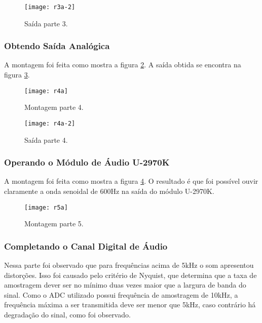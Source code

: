         \begin{figure}[H]
            \centering
            \caption{Saída parte 3.}
            \texttt{[image: r3a-2]}
            
            \label{fig:r3a-2}
        \end{figure}

    \subsubsection{Obtendo Saída Analógica}
    A montagem foi feita como mostra a figura \ref{fig:r4a}. A saída obtida se encontra na figura \ref{fig:r4a-2}.
    
         \begin{figure}[H]
             \centering
             \caption{Montagem parte 4.}
             \texttt{[image: r4a]}
             
             \label{fig:r4a}
            \end{figure}
            
            \begin{figure}[H]
                \centering
                \caption{Saída parte 4.}
                \texttt{[image: r4a-2]}
                
                \label{fig:r4a-2}
            \end{figure}
            
   \subsubsection{Operando o Módulo de Áudio U-2970K}
    A montagem foi feita como mostra a figura \ref{fig:r5a}. O resultado é que foi possível ouvir claramente a onda senoidal de 600Hz na saída do módulo U-2970K.
     
     \begin{figure}[H]
         \centering
         \caption{Montagem parte 5.}
         \texttt{[image: r5a]}
         
         \label{fig:r5a}
        \end{figure}
        
    \subsubsection{Completando o Canal Digital de Áudio}
    Nessa parte foi observado que para frequências acima de 5kHz o som apresentou distorções. Isso foi causado pelo critério de Nyquist, que determina que a taxa de amostragem dever ser no mínimo duas vezes maior que a largura de banda do sinal. Como o ADC utilizado possui frequência de amostragem de 10kHz, a frequência máxima a ser transmitida deve ser menor que 5kHz, caso contrário há degradação do sinal, como foi observado.
    
